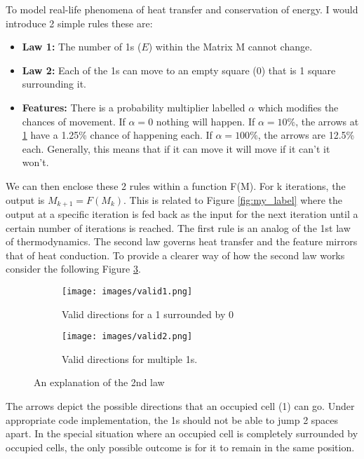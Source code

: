 \vspace{0.3cm}
 To model real-life phenomena of heat transfer and conservation of energy. I would introduce 2 simple rules these are:
\begin{itemize}
    \item \textbf{Law 1: }The number of 1s ($E$) within the Matrix M cannot change.
    \item \textbf{Law 2: }Each of the 1s can move to an empty square (0) that is 1 square surrounding it.
    \item \textbf{Features: }There is a probability multiplier labelled $\alpha$ which modifies the chances of movement. If $\alpha=0$ nothing will happen. If $\alpha=10\%$, the arrows at \ref{fig:directions_1} have a 1.25\% chance of happening each. If $\alpha=100\%$, the arrows are 12.5\% each. Generally, this means that if it can move it will move if it can't it won't. 
\end{itemize}
We can then enclose these 2 rules within a function F(M). For k iterations, the output is $M_{k+1}=F(M_{k})$. This is related to Figure \ref{fig:my_label} where the output at a specific iteration is fed back as the input for the next iteration until a certain number of iterations is reached. The first rule is an analog of the 1st law of thermodynamics. The second law governs heat transfer and the feature mirrors that of heat conduction. To provide a clearer way of how the second law works consider the following Figure \ref{fig:valid_directions}. 
\begin{figure}[H]
     \centering
     \begin{subfigure}[h]{0.3\textwidth}
         \centering
         \texttt{[image: images/valid1.png]}
         \caption{Valid directions for a 1 surrounded by 0}
         \label{fig:directions_1}
     \end{subfigure}
      \hspace{0.7cm}
     \begin{subfigure}[h]{0.3\textwidth}
         \centering
         \texttt{[image: images/valid2.png]}
         \caption{Valid directions for multiple 1s.}
         \label{fig:directions_2}
     \end{subfigure}
        \caption{An explanation of the 2nd law}
        \label{fig:valid_directions}
\end{figure}
The arrows depict the possible directions that an occupied cell (1) can go. Under appropriate code implementation, the 1s should not be able to jump 2 spaces apart. In the special situation where an occupied cell is completely surrounded by occupied cells, the only possible outcome is for it to remain in the same position. \par
